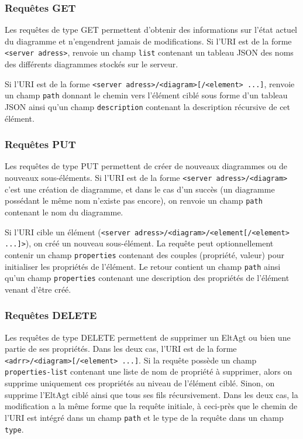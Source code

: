 \subsubsection{Requêtes GET}
Les requêtes de type GET permettent d'obtenir des informations sur l'état actuel du diagramme et n'engendrent jamais de modifications.
Si l'URI est de la forme \lstinline$<server adress>$, renvoie un champ \lstinline$list$ contenant un tableau JSON des noms des différents diagrammes stockés sur le serveur.

Si l'URI est de la forme \lstinline$<server adress>/<diagram>[/<element> ...]$, renvoie un champ \lstinline$path$ donnant le chemin vers l'élément ciblé sous forme d'un tableau JSON ainsi qu'un champ \lstinline$description$ contenant la description récursive de cet élément.

\subsubsection{Requêtes PUT}
Les requêtes de type PUT permettent de créer de nouveaux diagrammes ou de nouveaux sous-éléments.
Si l'URI est de la forme \lstinline$<server adress>/<diagram>$ c'est une création de diagramme, et dans le cas d'un succès (un diagramme possédant le même nom n'existe pas encore), on renvoie un champ \lstinline$path$ contenant le nom du diagramme.

Si l'URI cible un élément (\lstinline$<server adress>/<diagram>/<element[/<element> ...]>$), on créé un nouveau sous-élément.
La requête peut optionnellement contenir un champ \lstinline$properties$ contenant des couples (propriété, valeur) pour initialiser les propriétés de l’élément.
Le retour contient un champ \lstinline$path$ ainsi qu'un champ \lstinline$properties$ contenant une description des propriétés de l'élément venant d'être créé.

\subsubsection{Requêtes DELETE}
Les requêtes de type DELETE permettent de supprimer un EltAgt ou bien une partie de ses propriétés.
Dans les deux cas, l'URI est de la forme \lstinline$<adrr>/<diagram>[/<element> ...]$.
Si la requête possède un champ \lstinline$properties-list$ contenant une liste de nom de propriété à supprimer, alors on supprime uniquement ces propriétés au niveau de l'élément ciblé.
Sinon, on supprime l'EltAgt ciblé ainsi que tous ses fils récursivement.
Dans les deux cas, la modification a la même forme que la requête initiale, à ceci-près que le chemin de l'URI est intégré dans un champ \lstinline$path$ et le type de la requête dans un champ \lstinline$type$.

